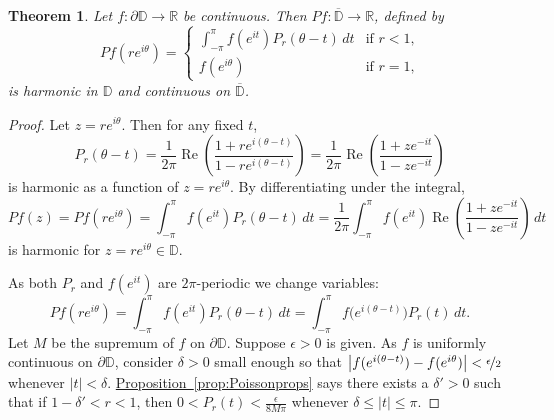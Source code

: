 \documentclass[12pt,openany]{book}
\renewcommand{\Re}{\operatorname{Re}}
\newcommand{\sabs}[1]{\lvert {#1} \rvert}
\newcommand{\babs}[1]{\bigl\lvert {#1} \bigr\rvert}
\newcommand{\R}{{\mathbb{R}}}
\newcommand{\D}{{\mathbb{D}}}
\theoremstyle{plain}
\newtheorem{thm}{Theorem}[section]
\theoremstyle{remark}
\theoremstyle{definition}
\theoremstyle{exercise}
\theoremstyle{example}
\newcommand{\propref}[1]{\hyperref[#1]{Proposition~\ref*{#1}}}
\begin{document}
\begin{thm} \label{thm:dirichsol}
Let $f \colon \partial \D \to \R$ be continuous.
Then
$Pf \colon \overline{\D} \to \R$, defined by
%
\begin{equation*}
Pf(re^{i\theta})
=
\begin{cases}
\int_{-\pi}^\pi f(e^{it}) P_{r}(\theta-t) \, dt
&
\text{if $r < 1$,} \\
f(e^{i\theta}) & \text{if $r=1$,}
\end{cases}
\end{equation*}
is harmonic in $\D$ and continuous on $\overline{\D}$.
\end{thm}

\begin{proof}
Let $z = re^{i\theta}$.
Then for any fixed $t$,
\begin{equation*}
P_r(\theta-t)
=
\frac{1}{2\pi}
\Re
\left(
\frac{1+re^{i(\theta-t)}}{1-re^{i(\theta-t)}}
\right) 
=
\frac{1}{2\pi}
\Re
\left(
\frac{1+ze^{-it}}{1-ze^{-it}}
\right)
\end{equation*}
is harmonic as a function of $z=re^{i\theta}$.
By differentiating under the integral,
\begin{equation*}
Pf(z)
=
Pf(re^{i\theta})
=
\int_{-\pi}^\pi f(e^{it}) P_r(\theta-t) \, dt
=
\frac{1}{2\pi}
\int_{-\pi}^\pi f(e^{it}) 
\Re
\left(
\frac{1+z e^{-it}}{1-z e^{-it}}
\right) 
\, dt
\end{equation*}
is harmonic for $z = re^{i\theta} \in \D$.

As both $P_r$ and $f(e^{it})$ are $2 \pi$-periodic we 
change variables:
\begin{equation*}
Pf(re^{i\theta})
=
\int_{-\pi}^\pi f(e^{it}) P_r(\theta-t) \, dt
=
\int_{-\pi}^\pi f\bigl(e^{i(\theta-t)}\bigr) P_r(t) \, dt .
\end{equation*}
Let $M$ be the supremum of
$f$ on $\partial \D$.  Suppose $\epsilon > 0$ is given.
As $f$ is uniformly continuous on $\partial \D$, consider $\delta > 0$
small enough so that $\babs{f(e^{i(\theta-t)})-f(e^{i\theta})} <
\nicefrac{\epsilon}{2}$ whenever $\sabs{t} < \delta$.
\propref{prop:Poissonprops} says there exists
a $\delta' > 0$ such that if  
$1-\delta' < r < 1$, then
$0 < P_r(t) < \frac{\epsilon}{8M\pi}$
whenever $\delta \leq \sabs{t} \leq \pi$.


\end{proof}
\end{document}
